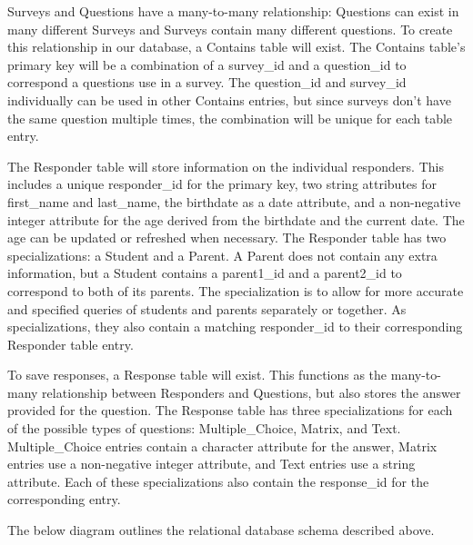 \documentclass[letterpaper,10pt,serif, draftclsnofoot,onecolumn, compsoc, titlepage]{IEEEtran}
\begin{document}
Surveys and Questions have a many-to-many relationship: Questions can exist in many different Surveys and Surveys contain many different questions.
To create this relationship in our database, a Contains table will exist.
The Contains table's primary key will be a combination of a survey\_id and a question\_id to correspond a questions use in a survey.
The question\_id and survey\_id individually can be used in other Contains entries, but since surveys don't have the same question multiple times, the combination will be unique for each table entry.

The Responder table will store information on the individual responders.
This includes a unique responder\_id for the primary key, two string attributes for first\_name and last\_name, the birthdate as a date attribute, and a non-negative integer attribute for the age derived from the birthdate and the current date.
The age can be updated or refreshed when necessary.
The Responder table has two specializations: a Student and a Parent.
A Parent does not contain any extra information, but a Student contains a parent1\_id and a parent2\_id to correspond to both of its parents.
The specialization is to allow for more accurate and specified queries of students and parents separately or together.
As specializations, they also contain a matching responder\_id to their corresponding Responder table entry.

To save responses, a Response table will exist.
This functions as the many-to-many relationship between Responders and Questions, but also stores the answer provided for the question.
The Response table has three specializations for each of the possible types of questions: Multiple\_Choice, Matrix, and Text.
Multiple\_Choice entries contain a character attribute for the answer, Matrix entries use a non-negative integer attribute, and Text entries use a string attribute.
Each of these specializations also contain the response\_id for the corresponding entry.

The below diagram outlines the relational database schema described above.
\end{document}
